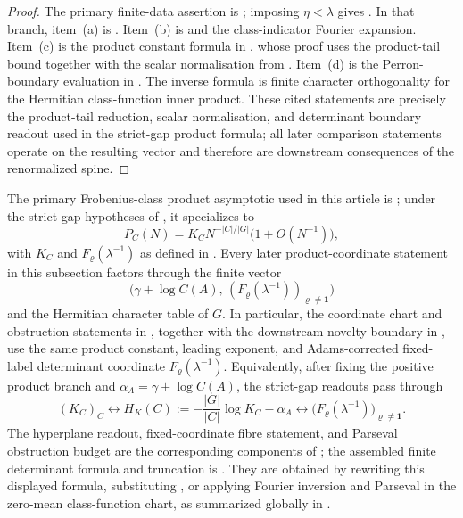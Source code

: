 \begin{proof}
  The primary finite-data assertion is
  ; imposing
  \(\eta<\lambda\) gives .  In that branch,
  item~\textup{(a)} is .  Item~\textup{(b)} is
   and the class-indicator Fourier expansion.
  Item~\textup{(c)} is the product constant formula in
  , whose proof uses the product-tail
  bound together with the scalar normalisation from
  .
  Item~\textup{(d)} is the Perron-boundary evaluation in
  .
  The inverse formula is finite character orthogonality for the Hermitian
  class-function inner product.  These cited statements are precisely the
  product-tail reduction, scalar normalisation, and determinant boundary
  readout used in the strict-gap product formula; all later comparison
  statements operate on the resulting vector and therefore are downstream
  consequences of the renormalized spine.
\end{proof}

\begin{corollary}
  \label{cor:class-product-main-theorem-primacy}
  \label{prop:class-product-consequence-scope}
  The primary Frobenius-class product asymptotic used in this article is
  ; under the strict-gap hypotheses of
  , it specializes to
  \[
    P_C(N)=K_C N^{-|C|/|G|}\bigl(1+O(N^{-1})\bigr),
  \]
  with \(K_C\) and \(F_\varrho(\lambda^{-1})\) as defined in
  .  Every later product-coordinate
  statement in this subsection factors through the finite vector
  \[
    \bigl(\gamma+\log C(A),\,
      (F_\varrho(\lambda^{-1}))_{\varrho\ne\mathbf1}\bigr)
  \]
  and the Hermitian character table of \(G\).  In particular,
  the coordinate chart and obstruction statements in
  , together with the downstream
  novelty boundary in , use the same
  product constant, leading exponent, and Adams-corrected fixed-label
  determinant coordinate \(F_\varrho(\lambda^{-1})\).  Equivalently,
  after fixing the positive product branch and
  \(\alpha_A=\gamma+\log C(A)\), the strict-gap readouts pass through
  \[
    (K_C)_C
    \longleftrightarrow
    H_K(C):=-\frac{|G|}{|C|}\log K_C-\alpha_A
    \longleftrightarrow
    \bigl(F_\varrho(\lambda^{-1})\bigr)_{\varrho\ne\mathbf1}.
  \]
  The hyperplane readout, fixed-coordinate fibre statement, and Parseval
  obstruction budget are the corresponding components of
  ; the assembled finite
  determinant formula and truncation is
  .  They
  are obtained by rewriting this displayed formula, substituting
  , or applying Fourier inversion and
  Parseval in the zero-mean class-function chart, as summarized globally in
  .
\end{corollary}
